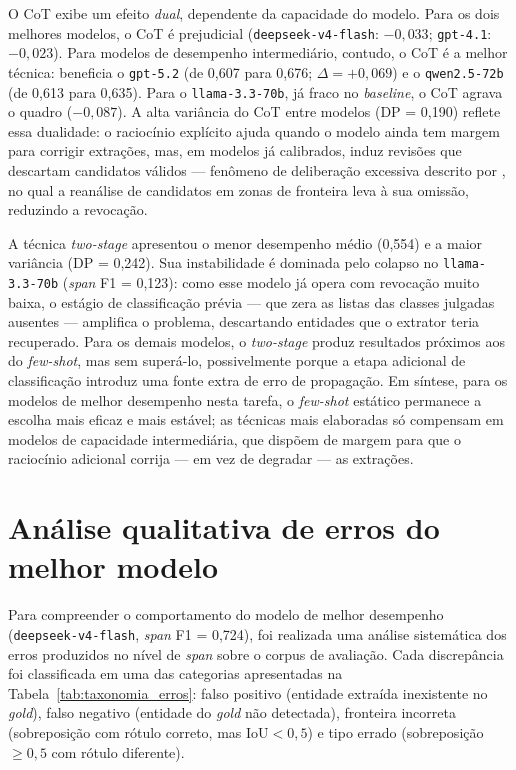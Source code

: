 O CoT exibe um efeito \emph{dual}, dependente da capacidade do modelo. Para os dois melhores modelos, o CoT é prejudicial (\texttt{deepseek-v4-flash}: $-0{,}033$; \texttt{gpt-4.1}: $-0{,}023$). Para modelos de desempenho intermediário, contudo, o CoT é a melhor técnica: beneficia o \texttt{gpt-5.2} (de 0,607 para 0,676; $\Delta = +0{,}069$) e o \texttt{qwen2.5-72b} (de 0,613 para 0,635). Para o \texttt{llama-3.3-70b}, já fraco no \textit{baseline}, o CoT agrava o quadro ($-0{,}087$). A alta variância do CoT entre modelos (DP = 0,190) reflete essa dualidade: o raciocínio explícito ajuda quando o modelo ainda tem margem para corrigir extrações, mas, em modelos já calibrados, induz revisões que descartam candidatos válidos --- fenômeno de deliberação excessiva descrito por , no qual a reanálise de candidatos em zonas de fronteira leva à sua omissão, reduzindo a revocação.

A técnica \textit{two-stage} apresentou o menor desempenho médio (0,554) e a maior variância (DP = 0,242). Sua instabilidade é dominada pelo colapso no \texttt{llama-3.3-70b} (\textit{span} F1 = 0,123): como esse modelo já opera com revocação muito baixa, o estágio de classificação prévia --- que zera as listas das classes julgadas ausentes --- amplifica o problema, descartando entidades que o extrator teria recuperado. Para os demais modelos, o \textit{two-stage} produz resultados próximos aos do \textit{few-shot}, mas sem superá-lo, possivelmente porque a etapa adicional de classificação introduz uma fonte extra de erro de propagação. Em síntese, para os modelos de melhor desempenho nesta tarefa, o \textit{few-shot} estático permanece a escolha mais eficaz e mais estável; as técnicas mais elaboradas só compensam em modelos de capacidade intermediária, que dispõem de margem para que o raciocínio adicional corrija --- em vez de degradar --- as extrações.

\section{Análise qualitativa de erros do melhor modelo}
\label{sec:analise_erros}

Para compreender o comportamento do modelo de melhor desempenho (\texttt{deepseek-v4-flash}, \textit{span} F1 = 0,724), foi realizada uma análise sistemática dos erros produzidos no nível de \textit{span} sobre o corpus de avaliação. Cada discrepância foi classificada em uma das categorias apresentadas na Tabela~\ref{tab:taxonomia_erros}: falso positivo (entidade extraída inexistente no \textit{gold}), falso negativo (entidade do \textit{gold} não detectada), fronteira incorreta (sobreposição com rótulo correto, mas $\text{IoU} < 0{,}5$) e tipo errado (sobreposição $\geq 0{,}5$ com rótulo diferente).

